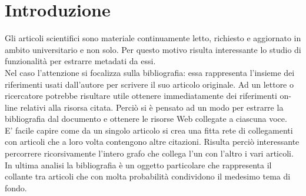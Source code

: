 \section{Introduzione}

Gli articoli scientifici sono materiale continuamente letto, richiesto e aggiornato in ambito universitario e non solo. Per questo motivo risulta interessante lo studio di funzionalità per estrarre metadati da essi.\\
Nel caso l'attenzione si focalizza sulla bibliografia: essa rappresenta l'insieme dei riferimenti usati dall'autore per scrivere il suo articolo originale. Ad un lettore o ricercatore potrebbe risultare utile ottenere immediatamente dei riferimenti on-line relativi alla risorsa citata. Perciò si è pensato ad un modo per estrarre la bibliografia dal documento e ottenere le risorse Web collegate a ciascuna voce.
\\
E' facile capire come da un singolo articolo si crea una fitta rete di collegamenti con articoli che a loro volta contengono altre citazioni. Risulta perciò interessante percorrere ricorsivamente l'intero grafo che collega l'un con l'altro i vari articoli. 
\\
In ultima analisi la bibliografia è un oggetto particolare che rappresenta il collante tra articoli che con molta probabilità condividono il medesimo tema di fondo.



